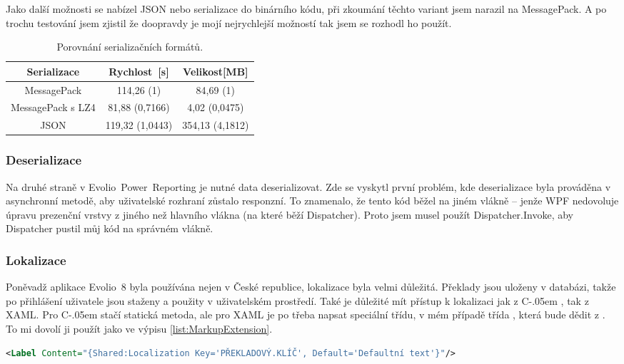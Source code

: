 \documentclass[czech,bachelorpractice,dept460,male,csharp]{diploma}
\newcommand{\EvolioEight}{Evolio~8}
\newcommand{\EFilters}{Evolio~Power~Reporting}
\newcommand{\Csharp}{%
  {\settoheight{\dimen0}{C}C\kern-.05em \resizebox{!}{\dimen0}{\raisebox{\depth}{\#}}}}
\begin{document}
			Jako další možnosti se nabízel JSON nebo serializace do binárního kódu, při zkoumání těchto variant jsem narazil na MessagePack. A po trochu testování jsem zjistil že doopravdy je mojí nejrychlejší možností tak jsem se rozhodl ho použít.
			\begin{table}[h!]
				\centering
				\begin{tabular}{|c|c|c|} 
 					\hline
 					Serializace & Rychlost\footnotemark\ [s] & Velikost[MB] \\\hline\hline
 					MessagePack & 114,26 (1)\footnotemark & 84,69 (1)\footnotemark[\value{footnote}] 	\\\hline
 					MessagePack s LZ4 & 81,88 (0,7166)\footnotemark[\value{footnote}] & 4,02 (0,0475)\footnotemark[\value{footnote}]   \\\hline
 					JSON & 119,32 (1,0443)\footnotemark[\value{footnote}]  & 354,13 (4,1812)\footnotemark[\value{footnote}] 	\\\hline
				\end{tabular}
				
				\caption{Porovnání serializačních formátů.}
				\label{table:serilization}
			\end{table}
		\subsubsection{Deserializace}
			 Na druhé straně v {\EFilters} je nutné data deserializovat. Zde se vyskytl první problém, kde deserializace byla prováděna v asynchronní metodě, aby uživatelské rozhraní zůstalo responzní. To znamenalo, že tento kód běžel na jiném vlákně -- jenže WPF nedovoluje úpravu prezenční vrstvy z jiného než hlavního vlákna (na které běží Dispatcher). Proto jsem musel použít Dispatcher.Invoke, aby Dispatcher pustil můj kód na správném vlákně.

			 

		\subsubsection{Lokalizace}
			Poněvadž aplikace {\EvolioEight} byla používána nejen v České republice, lokalizace byla velmi důležitá. Překlady jsou uloženy v databázi, takže po přihlášení uživatele jsou staženy a použity v uživatelském prostředí. Také je důležité mít přístup k lokalizaci jak z {\Csharp}, tak z XAML. Pro {\Csharp} stačí statická metoda, ale pro XAML je po třeba napsat speciální třídu, v mém případě třída , která bude dědit z . To mi dovolí ji
použít jako ve výpisu \ref{list:MarkupExtension}.
			\begin{lstlisting}[language=XML,caption={MarkupExtension příkad},label={list:MarkupExtension}]
<Label Content="{Shared:Localization Key='PŘEKLADOVÝ.KLÍČ', Default='Defaultní text'}"/>
			\end{lstlisting}
			 
\end{document}
